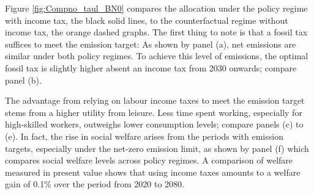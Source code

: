 \begin{figure}[h!!]
\end{figure} 


Figure  \ref{fig:Compno_taul_BN0} compares the allocation under the policy regime with income tax, the black solid lines, to the counterfactual regime without income tax, the orange dashed graphs. 
The first thing to note is that a fossil tax suffices to meet the emission target: As shown by panel (a), net emissions are similar under both policy regimes. To achieve this level of emissions, the optimal fossil tax is slightly higher absent an income tax from 2030 onwards; compare panel (b).

The advantage from relying on labour income taxes to meet the emission target stems from a higher utility from leisure. Less time spent working, especially for high-skilled workers,  outweighs lower consumption levels; compare panels (c) to (e). In fact, the rise in social welfare arises from the periods with  emission targets, especially under the net-zero emission limit, as shown by panel (f) which compares social welfare levels across policy regimes. A comparison of welfare measured in present value  shows that using income taxes amounts to a welfare gain of 0.1\% over the period from 2020 to 2080.

